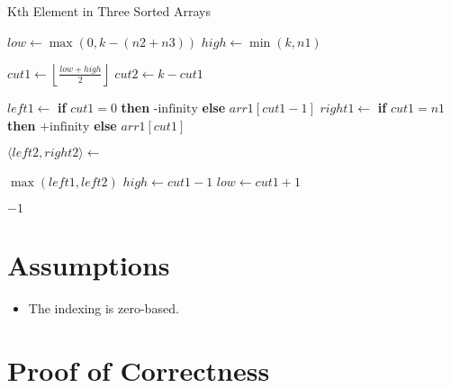 \documentclass{article}
\begin{document}
\begin{algorithm}
\caption{Kth Element in Three Sorted Arrays}
\begin{algorithmic}[1]
            \State \Return {}
        \EndIf

            \State \Return {}
        \EndIf

        \State $low \gets \max(0, k - (n2 + n3))$
        \State $high \gets \min(k, n1)$

            \State $cut1 \gets \left\lfloor\frac{low + high}{2}\right\rfloor$
            \State $cut2 \gets k - cut1$

            \State $left1 \gets$ \textbf{if} $cut1 = 0$ \textbf{then} $\text{-infinity}$ \textbf{else} $arr1[cut1 - 1]$
            \State $right1 \gets$ \textbf{if} $cut1 = n1$ \textbf{then} $\text{+infinity}$ \textbf{else} $arr1[cut1]$

            \State $\langle left2, right2 \rangle \gets$  

                \State \Return $\max(left1, left2)$
                \State $high \gets cut1 - 1$
            \Else
                \State $low \gets cut1 + 1$
            \EndIf
        \EndWhile

        \State \Return $-1$ 
    \EndFunction
\end{algorithmic}
\end{algorithm}

\newpage

\section{Assumptions}

\begin{itemize}
  \item The indexing is zero-based.
\end{itemize}

\section{Proof of Correctness}
\end{document}
